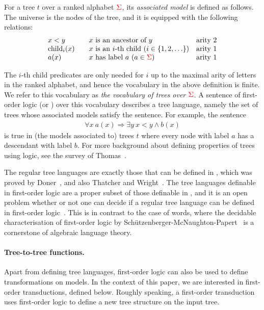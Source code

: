 \begin{definition}\label{def:tree-model}
   For a tree $t$  over a ranked alphabet ${\color{red}{\Sigma}}$, its \emph{associated model} 
    is defined as follows. The  universe is the nodes of the tree, and it is equipped with the following relations:
   $$\begin{array}{lcll}
   x<y &  &   \text{$x$ is an ancestor of $y$} & \text{arity 2}\\
   \mathrm{child}_i(x) &  & \text{$x$ is an $i$-th child ($i\in \{1,2,\ldots\}$)} & \text{arity 1} \\
   a(x) &  &   \text{$x$ has label $a$ ($a \in {\color{red}{\Sigma}}$)} & \text{arity 1}
   \end{array}$$
    \end{definition}

The $i$-th child predicates are only needed for $i$ up to the maximal arity of letters in the ranked alphabet, and hence the vocabulary in the above definition is finite. We refer to this vocabulary as \emph{the vocabulary of trees over ${\color{red}{\Sigma}}$}.
 A sentence of first-order logic (or  \mso)  over this vocabulary   describes a tree language, namely the set of trees whose associated models satisfy the sentence.  For example, the sentence 
 \begin{align*}
 \forall x \ a(x) \Rightarrow \exists y \ x < y \land b(x)
 \end{align*} 
 is true in (the models associated to)  trees $t$ where every node with label $a$ has a descendant with label $b$. For more background about defining properties of trees using logic, see the survey of Thomas~\cite{thomas1997languages}.
 
 The regular tree languages are exactly those that can be defined in \mso, which was proved by Doner~\cite[Corollary 3.11]{Doner70}, and also Thatcher and Wright~\cite[p.~74]{thatcherGeneralizedFiniteAutomata1968}. The tree languages definable in first-order logic are a proper subset  of those definable in \mso, and it is an open problem whether or not one can decide if a regular tree language can be defined in first-order logic~\cite[Section 3]{bojanczyk2015automata}. This is in contrast to the case of words, where the decidable characterisation of  first-order logic by Sch\"utzenberger-McNaughton-Papert~\cite[Theorem 10.5]{McNaughtonPapert71} is  a cornerstone of algebraic language theory.
 
 \paragraph*{Tree-to-tree functions.}
 Apart from defining tree languages, first-order logic can also be used  to define transformations on  models. In the context of this paper, we are interested in first-order transductions, defined below.  Roughly speaking, a first-order transduction uses first-order logic to define a new tree structure on the input tree.

